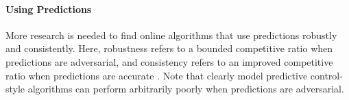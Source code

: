 \paragraph{Using Predictions} More research is needed to find online algorithms that use predictions robustly and consistently. Here, robustness refers to a bounded competitive ratio when predictions are adversarial, and consistency refers to an improved competitive ratio when predictions are accurate \cite{Li2021}. Note that clearly model predictive control-style algorithms can perform arbitrarily poorly when predictions are adversarial.